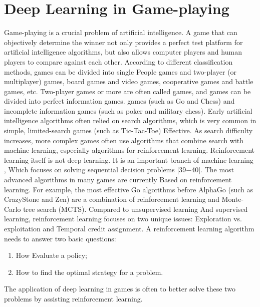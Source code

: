 \documentclass[11pt,en]{elegantpaper}
\begin{document}
\section{Deep Learning in Game-playing}
Game-playing is a crucial problem of artificial intelligence. A game that can objectively determine the winner not only provides a perfect test platform for artificial intelligence algorithms, but also allows computer players and human players to compare against each other. According to different classification methods, games can be divided into single People games and two-player (or multiplayer) games, board games and video games, cooperative games and battle games, etc. Two-player games or more are often called games, and games can be divided into perfect information games. games (such as Go and Chess) and incomplete information games (such as poker and military chess). Early artificial intelligence algorithms often relied on search algorithms, which is very common in simple, limited-search games (such as Tic-Tac-Toe) Effective. As search difficulty increases, more complex games often use algorithms that combine search with machine learning, especially algorithms for reinforcement learning. Reinforcement learning itself is not deep learning. It is an important branch of machine learning , Which focuses on solving sequential decision problems [39−40]. The most advanced algorithms in many games are currently Based on reinforcement learning. For example, the most effective Go algorithms before AlphaGo (such as CrazyStone and Zen) are a combination of reinforcement learning and Monte-Carlo tree search (MCTS). Compared to unsupervised learning And supervised learning, reinforcement learning focuses on two unique issues: Exploration vs. exploitation and Temporal credit assignment. A reinforcement learning algorithm needs to answer two basic questions: 
\begin{enumerate}
	\item How Evaluate a policy;
	\item How to find the optimal strategy for a problem.
\end{enumerate}

The application of deep learning in games is often to better solve these two problems by assisting reinforcement learning.
\end{document}

